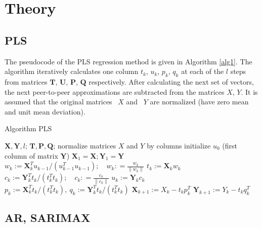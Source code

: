 \documentclass{article}
\begin{document}
\section{Theory}
\subsection{PLS}
The pseudocode of the PLS regression method is given in Algorithm \ref{alg1}.
The algorithm iteratively calculates one column $t_k$, $u_k$, $p_k$, $q_k$ at each of the $ l $ steps from  matrices $\mathbf{T}$, $\mathbf{U}$, $\mathbf{P}$, $\mathbf{Q}$ respectively. 
After calculating the next set of vectors, the next peer-to-peer approximations are subtracted from the matrices $ X $, $ Y $.
It is assumed that the original matrices ~$X$ and ~$Y$ are normalized (have zero mean and unit mean deviation).

\begin{algorithm}[h]\label{alg1}
	\caption{Algorithm PLS}
	\label{ch1:pls_pseudocode}
	\begin{algorithmic}[1]
		\REQUIRE $\mathbf{X}, \mathbf{Y}, l$;
		\ENSURE $\mathbf{T}, \mathbf{P}, \mathbf{Q}$;
    		\STATE normalize matrices $X$ and $Y$ by columns
		\STATE initialize $u_0$ (first column of matrix $\mathbf{Y}$)
		\STATE $\mathbf{X}_1 = \mathbf{X}; \mathbf{Y}_1 = \mathbf{Y}$
		\REPEAT
		\vspace{0.1cm}
		\STATE $w_k := \mathbf{X}_k^{T} u_{k-1} / (u_{k-1}^{T} u_{k-1}); \quad w_k: = \frac{w_k}{\| w_k \|}$
		\vspace{0.1cm}
		\STATE $t_k := \mathbf{X}_k w_k$
		\vspace{0.1cm}
		\STATE $c_k := \mathbf{Y}_k^{T} t_k / (t_k^{T} t_k); \quad c_k: = \frac{c_k}{\| c_k \|}$
		\vspace{0.1cm}
		\STATE $u_k := \mathbf{Y}_k c_k$
		\vspace{0.1cm}
		\STATE $p_k:= \mathbf{X}_k^{T}t_k/(t_k^{T}t_k),\ 
		q_k := \mathbf{Y}_k^{T}t_k/(t_k^{T}t_k)$
		\vspace{0.2cm}
		\STATE $\mathbf{X}_{k+1} :=  X_k - t_k p_k^{T}$
		\vspace{0.2cm}
		\STATE $\mathbf{Y}_{k + 1} :=  Y_k - t_k q_k^{T}$ 
		\ENDFOR
	\end{algorithmic}
\end{algorithm}
\subsection{AR, SARIMAX}
\end{document}
